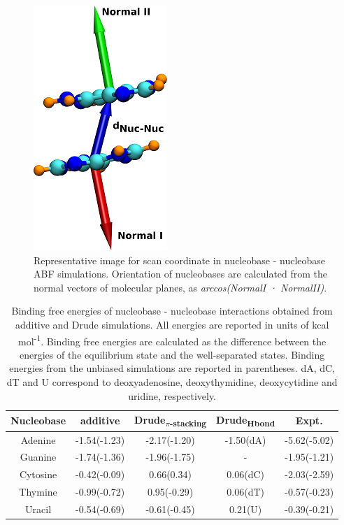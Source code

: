     \begin{figure}
        \centering
        \includegraphics{Chapter1/Figures/Figure4.png}
        \caption[Representative image for scan coordinate in nucleobase - nucleobase ABF simulations]{Representative image for scan coordinate in nucleobase - nucleobase ABF simulations. Orientation of nucleobases are  calculated from the normal vectors of molecular planes, as \textit{arccos(NormalI · NormalII)}.}
    \end{figure}

    \begin{table}
        \centering
        \caption[Binding free energies of nucleobase - nucleobase interactions obtained from additive and Drude simulations]{Binding free energies of nucleobase - nucleobase interactions obtained from additive and Drude simulations. All energies are reported in units of kcal mol\textsuperscript{-1}. Binding free energies are calculated as the difference between the energies of the equilibrium state and the well-separated states. Binding energies from the unbiased simulations are reported in parentheses. dA, dC, dT and U correspond to deoxyadenosine, deoxythymidine, deoxycytidine and uridine, respectively.}
        \begin{tabular}{ccccc}
            \toprule
            Nucleobase & additive & Drude\textsubscript{$\pi$-stacking} & Drude\textsubscript{Hbond} & Expt.\supercite{schyman_exploring_2013} \\ \midrule
            Adenine & -1.54(-1.23) & -2.17(-1.20) & -1.50(dA)	& -5.62(-5.02) \\
            Guanine & -1.74(-1.36) & -1.96(-1.75) & - & -1.95(-1.21) \\
            Cytosine & -0.42(-0.09) & 0.66(0.34) & 0.06(dC) & -2.03(-2.59) \\
            Thymine & -0.99(-0.72) & 0.95(-0.29) & 0.06(dT) & -0.57(-0.23) \\
            Uracil & -0.54(-0.69) & -0.61(-0.45) & 0.21(U) & -0.39(-0.21) \\ \bottomrule
        \end{tabular}
    \end{table}

